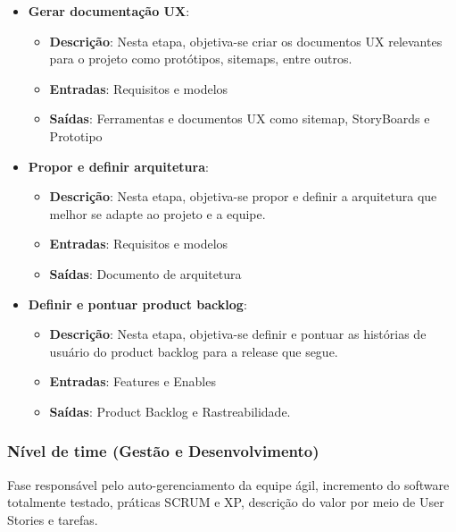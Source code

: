 \begin{itemize}
  \item \textbf{Gerar documentação UX}:
  \begin{itemize}
    \item \textbf{Descrição}: Nesta etapa, objetiva-se criar os documentos UX relevantes para o projeto como
      protótipos, sitemaps, entre outros.
    \item \textbf{Entradas}: Requisitos e modelos
    \item \textbf{Saídas}: Ferramentas e documentos UX como sitemap, StoryBoards e Prototipo
  \end{itemize}
  \newpage
  \item \textbf{Propor e definir arquitetura}:
  \begin{itemize}
    \item \textbf{Descrição}: Nesta etapa, objetiva-se propor e definir a arquitetura que melhor se adapte ao projeto
      e a equipe.
    \item \textbf{Entradas}: Requisitos e modelos
    \item \textbf{Saídas}: Documento de arquitetura
  \end{itemize}
  \item \textbf{Definir e pontuar product backlog}:
  \begin{itemize}
    \item \textbf{Descrição}: Nesta etapa, objetiva-se definir e pontuar as histórias de usuário do product backlog
      para a release que segue.
    \item \textbf{Entradas}: Features e Enables
    \item \textbf{Saídas}: Product Backlog e Rastreabilidade.
  \end{itemize}
\end{itemize}

\subsubsection{Nível de time (Gestão e Desenvolvimento)}

Fase responsável pelo auto-gerenciamento da equipe ágil, incremento do software totalmente testado, práticas SCRUM e XP, descrição do valor por meio de User Stories e tarefas.

